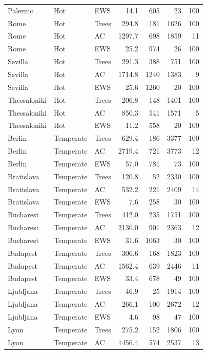 \begin{table}[ht]
\begin{tabular}{lllrrrr}
  Palermo & Hot & EWS & 14.1 & 605 & 23 & 100 \\ 
  Rome & Hot & Trees & 294.8 & 181 & 1626 & 100 \\ 
  Rome & Hot & AC & 1297.7 & 698 & 1859 & 11 \\ 
  Rome & Hot & EWS & 25.2 & 974 & 26 & 100 \\ 
  Sevilla & Hot & Trees & 291.3 & 388 & 751 & 100 \\ 
  Sevilla & Hot & AC & 1714.8 & 1240 & 1383 & 9 \\ 
  Sevilla & Hot & EWS & 25.6 & 1260 & 20 & 100 \\ 
  Thessaloniki & Hot & Trees & 206.8 & 148 & 1401 & 100 \\ 
  Thessaloniki & Hot & AC & 850.3 & 541 & 1571 & 5 \\ 
  Thessaloniki & Hot & EWS & 11.2 & 558 & 20 & 100 \\ 
  Berlin & Temperate & Trees & 629.4 & 186 & 3377 & 100 \\ 
  Berlin & Temperate & AC & 2719.4 & 721 & 3773 & 12 \\ 
  Berlin & Temperate & EWS & 57.0 & 781 & 73 & 100 \\ 
  Bratislava & Temperate & Trees & 120.8 & 52 & 2330 & 100 \\ 
  Bratislava & Temperate & AC & 532.2 & 221 & 2409 & 14 \\ 
  Bratislava & Temperate & EWS & 7.6 & 258 & 30 & 100 \\ 
  Bucharest & Temperate & Trees & 412.0 & 235 & 1751 & 100 \\ 
  Bucharest & Temperate & AC & 2130.0 & 901 & 2363 & 12 \\ 
  Bucharest & Temperate & EWS & 31.6 & 1063 & 30 & 100 \\ 
  Budapest & Temperate & Trees & 306.6 & 168 & 1823 & 100 \\ 
  Budapest & Temperate & AC & 1562.4 & 639 & 2446 & 11 \\ 
  Budapest & Temperate & EWS & 33.4 & 678 & 49 & 100 \\ 
  Ljubljana & Temperate & Trees & 46.9 & 25 & 1914 & 100 \\ 
  Ljubljana & Temperate & AC & 266.1 & 100 & 2672 & 12 \\ 
  Ljubljana & Temperate & EWS & 4.6 & 98 & 47 & 100 \\ 
  Lyon & Temperate & Trees & 275.2 & 152 & 1806 & 100 \\ 
  Lyon & Temperate & AC & 1456.4 & 574 & 2537 & 13 \\ 

\end{tabular}
\end{table}
